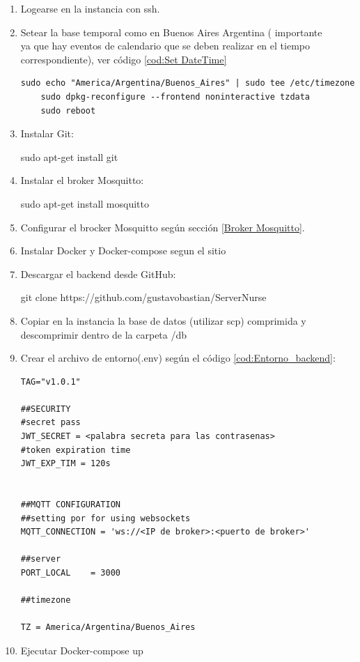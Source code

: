 \begin{enumerate}


\item Logearse en la instancia con ssh.
\item Setear la base temporal como en Buenos Aires Argentina ( importante \\ ya que hay eventos de calendario que se deben realizar en el tiempo correspondiente), ver código \ref{cod:Set DateTime}\\

\begin{lstlisting}[label=cod:Set DateTime,caption=  Configuración zona horaria]
	sudo echo "America/Argentina/Buenos_Aires" | sudo tee /etc/timezone
	sudo dpkg-reconfigure --frontend noninteractive tzdata
	sudo reboot
\end{lstlisting}

\item Instalar Git:

	sudo apt-get install git
\item Instalar el broker Mosquitto:
	
	sudo apt-get install mosquitto
\item Configurar el brocker Mosquitto según sección \ref{Broker Mosquitto}.
\item Instalar Docker y Docker-compose segun el sitio\citep{WEBSITE:8}
\item Descargar el backend desde GitHub:

	git clone  https://github.com/gustavobastian/ServerNurse
\item Copiar en la instancia la base de datos (utilizar scp) comprimida y descomprimir dentro de la carpeta /db
\pagebreak
\item Crear el archivo de entorno(.env) según el código \ref{cod:Entorno_backend}:


\begin{lstlisting}[label=cod:Entorno_backend,caption=  Entorno del backend]
TAG="v1.0.1"

##SECURITY
#secret pass
JWT_SECRET = <palabra secreta para las contrasenas>
#token expiration time
JWT_EXP_TIM = 120s


##MQTT CONFIGURATION
##setting por for using websockets
MQTT_CONNECTION = 'ws://<IP de broker>:<puerto de broker>'

##server
PORT_LOCAL    = 3000

##timezone

TZ = America/Argentina/Buenos_Aires 
\end{lstlisting}


\item Ejecutar Docker-compose up
\end{enumerate}

